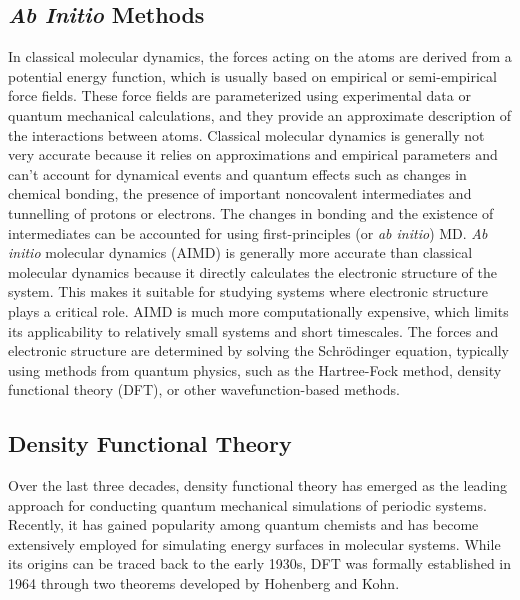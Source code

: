 \subsection{\textit{Ab Initio} Methods}
In classical molecular dynamics, the forces acting on the atoms are derived
from a potential energy function, which is usually based on empirical or
semi-empirical force fields. These force fields are parameterized using
experimental data or quantum mechanical calculations, and they provide an
approximate description of the interactions between atoms. Classical molecular
dynamics is generally not very accurate because it relies on approximations
and empirical parameters and can't account for dynamical events and quantum
effects such as changes in chemical bonding, the presence of important
noncovalent intermediates and tunnelling of protons or electrons. The changes
in bonding and the existence of intermediates can be accounted for using
first-principles (or \textit{ab initio}) MD. \textit{Ab initio} molecular
dynamics (AIMD) is generally more accurate than classical molecular dynamics
because it directly calculates the electronic structure of the system. This
makes it suitable for studying systems where electronic structure plays a
critical role. AIMD is much more computationally expensive, which limits its
applicability to relatively small systems and short timescales. The forces and
electronic structure are determined by solving the Schrödinger equation,
typically using methods from quantum physics, such as the Hartree-Fock method,
density functional theory (DFT), or other wavefunction-based methods.

\subsection{Density Functional Theory}
Over the last three decades, density functional theory has emerged as the
leading approach for conducting quantum mechanical simulations of periodic
systems. Recently, it has gained popularity among quantum chemists and has
become extensively employed for simulating energy surfaces in molecular
systems. While its origins can be traced back to the early 1930s, DFT was
formally established in 1964 through two theorems developed by Hohenberg and
Kohn.

